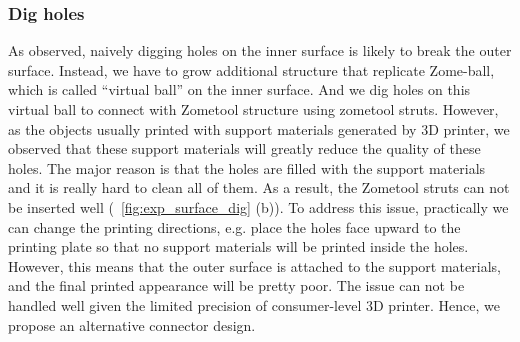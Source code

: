 \subsubsection{Dig holes}
As observed, naively digging holes on the inner surface is likely to break the outer surface.
Instead, we have to grow additional structure that replicate Zome-ball, which is called ``virtual ball'' on the inner surface.
And we dig holes on this virtual ball to connect with Zometool structure using zometool struts.
However, as the objects usually printed with support materials generated by 3D printer, we observed that these support materials will greatly reduce the quality of these holes.
The major reason is that the holes are filled with the support materials and it is really hard to clean all of them.
As a result, the Zometool struts can not be inserted well (\figname~\ref{fig:exp_surface_dig} (b)).
To address this issue, practically we can change the printing directions, e.g. place the holes face upward to the printing plate so that no support materials will be printed inside the holes.
However, this means that the outer surface is attached to the support materials, and the final printed appearance will be pretty poor.
The issue can not be handled well given the limited precision of consumer-level 3D printer.
Hence, we propose an alternative connector design.
    
